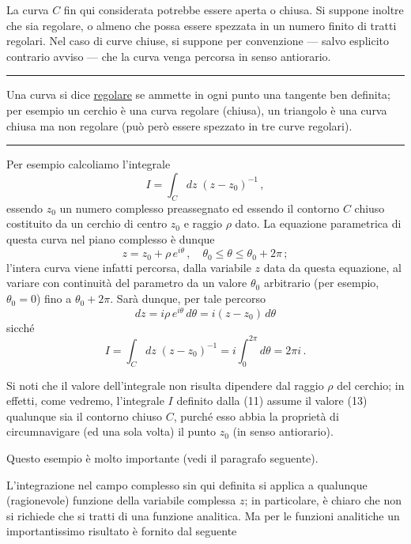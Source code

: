 \documentclass[11pt, a4paper]{book}
\numberwithin{equation}{section}
\begin{document}
La curva $C$ fin qui considerata potrebbe essere aperta o chiusa. Si suppone inoltre che sia regolare, o almeno che possa essere spezzata in un numero finito di tratti regolari. Nel caso di curve chiuse, si suppone per convenzione --- salvo esplicito contrario avviso --- che la curva venga percorsa in senso antiorario.

\noindent\rule{\linewidth}{0.4pt}

Una curva si dice \uline{regolare} se ammette in ogni punto una tangente ben definita; per esempio un cerchio è una curva regolare (chiusa), un triangolo è una curva chiusa ma non regolare (può però essere spezzato in tre curve regolari).

\noindent\rule{\linewidth}{0.4pt}


Per esempio calcoliamo l'integrale
\begin{equation}
I = \int_C dz\;(z - z_0)^{-1}\,, \tag{11}
\end{equation}
essendo $z_0$ un numero complesso preassegnato ed essendo il contorno $C$ chiuso costituito da un cerchio di centro $z_0$ e raggio $\rho$ dato. La equazione parametrica di questa curva nel piano complesso è dunque
\[
z = z_0 + \rho\,e^{i\theta}\,, \quad \theta_0 \leq \theta \leq \theta_0 + 2\pi\,;
\]
l'intera curva viene infatti percorsa, dalla variabile $z$ data da questa equazione, al variare con continuità del parametro da un valore $\theta_0$ arbitrario (per esempio, $\theta_0 = 0$) fino a $\theta_0 + 2\pi$. Sarà dunque, per tale percorso
\begin{equation}
dz = i\rho\,e^{i\theta}\,d\theta = i(z - z_0)\,d\theta \tag{12}
\end{equation}
sicché
\begin{equation}
I = \int_C dz\;(z-z_0)^{-1} = i\int_0^{2\pi} d\theta = 2\pi i\,. \tag{13}
\end{equation}

Si noti che il valore dell'integrale non risulta dipendere dal raggio $\rho$ del cerchio; in effetti, come vedremo, l'integrale $I$ definito dalla (11) assume il valore (13) qualunque sia il contorno chiuso $C$, purché esso abbia la proprietà di circumnavigare (ed una sola volta) il punto $z_0$ (in senso antiorario).

Questo esempio è molto importante (vedi il paragrafo seguente).

L'integrazione nel campo complesso sin qui definita si applica a qualunque (ragionevole) funzione della variabile complessa $z$; in particolare, è chiaro che non si richiede che si tratti di una funzione analitica. Ma per le funzioni analitiche un importantissimo risultato è fornito dal seguente
\end{document}
